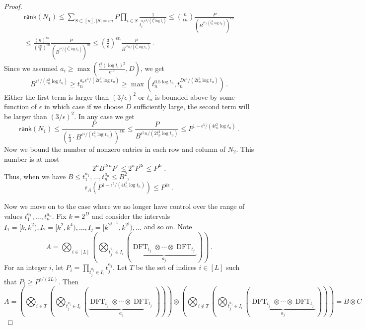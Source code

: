 \documentclass{toc}
\newcommand\rank{\textsf{rank}}
\DeclareMathOperator{\DFT}{DFT}
\begin{document}
\begin{proof}
\begin{eqnarray*}
\rank(N_1) \leq \sum_{S \subset [n], |S| = \epsilon n} P\prod_{i \in S}\frac{1}{t_i^{a_i \epsilon^4/(t_i^2 \log t_i)}} \leq \binom{n}{\epsilon n}\frac{P}{\left(B^{\epsilon^4/(t_n^2 \log t_n)}\right)^{\epsilon n}} \\  \leq \frac{(n)^{\epsilon n}}{\left(\frac{\epsilon n}{3}\right)^{\epsilon n}} \frac{P}{\left(B^{\epsilon^4/(t_n^2 \log t_n)}\right)^{\epsilon n}}\leq \left(\frac{3}{\epsilon}\right)^{\epsilon n} \frac{P}{B^{\epsilon^5 n/(t_n^2 \log t_n)}} \,.
\end{eqnarray*}
Since we assumed $a_i \geq \max\left(\frac{t_i^2(\log t_i)^2}{\epsilon^{10}}, D \right)$, we get
\[
B^{\epsilon^4/(t_n^2 \log t_n)} \geq t_n^{a_n \epsilon^4/(2 t_n^2 \log t_n)} \geq \max \left(t_n^{0.5 \log t_n},t_n^{D \epsilon^4/(2 t_n^2 \log t_n)} \right) \,.
\]
Either the first term is larger than $(3/\epsilon)^2$ or $t_n$ is bounded above by some function of $\epsilon$ in which case if we choose $D$ sufficiently large, the second term will be larger than $(3/\epsilon)^2$.  In any case we get
\[
\rank(N_1) \leq \frac{P}{\left(\frac{\epsilon}{3} \cdot  B^{\epsilon^4/(t_n^2 \log t_n)}\right)^{\epsilon n}} \leq \frac{P}{B^{\epsilon^5 n/(2t_n^2 \log t_n)}} \leq P^{1 - \epsilon^5/(4t_n^2 \log t_n)} \,.
\]
Now we bound the number of nonzero entries in each row and column of $N_2$.  This number is at most
\[
2^nB^{2 \epsilon n}P^{\epsilon} \leq 2^n P^{3\epsilon} \leq P^{4\epsilon} \,.
\]
Thus, when we have $B \leq t_1^{a_1}, \dots , t_n^{a_n} \leq B^2$, 
\[
\textsf{r}_A\left( P^{1 - \epsilon^5/(4t_n^2 \log t_n)} \right) \leq  P^{4\epsilon} \,.
\]

Now we move on to the case where we no longer have control over the range of values $t_1^{a_1}, \dots , t_n^{a_n}$.  Fix $k = 2^D$ and consider the intervals $I_1 = [k,k^2), I_2 = [k^2, k^4), \dots , I_j = [k^{2^{j-1}}, k^{2^j}), \dots $ and so on.  Note 
%
%
%
%
\[
A = \bigotimes_{i \in [L]}\left(\bigotimes_{t_j^{a_j} \in I_i} (\underbrace{\DFT_{t_j} \otimes \cdots \otimes \DFT_{t_j}}_\text{$a_j$})\right) \,.
\]
%
For an integer $i$, let $P_i = \prod_{t_j^{a_j} \in I_i}t_j^{a_j}$.  Let $T$ be the set of indices $i \in [L]$ such that $P_i \geq P^{\epsilon/(2L)}$.  Then 
%
%
%
%
\[
A = \left( \bigotimes_{i \in T}\left(\bigotimes_{t_j^{a_j} \in I_i} (\underbrace{\DFT_{t_j} \otimes \cdots \otimes \DFT_{t_j}}_\text{$a_j$})\right) \right) \otimes \left( \bigotimes_{i \notin T}\left(\bigotimes_{t_j^{a_j} \in I_i} (\underbrace{\DFT_{t_j} \otimes \cdots \otimes \DFT_{t_j}}_\text{$a_j$})\right) \right) = B \otimes C
\]
%


\end{proof}
\end{document}
